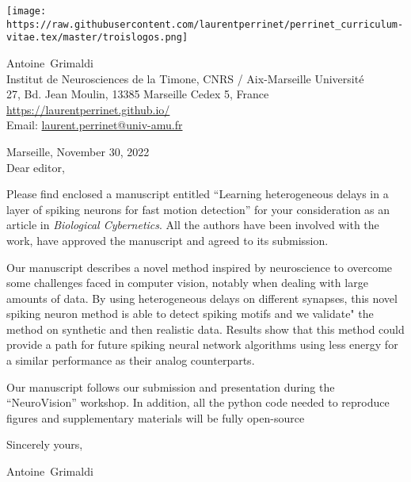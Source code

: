 \documentclass[10pt,english]{article}
\makeatletter
\newcommand{\LastName}{Grimaldi}%
\newcommand{\FirstName}{Antoine}%
\newcommand{\Institute}{Institut de Neurosciences de la Timone, CNRS / Aix-Marseille Universit\'e}%
\newcommand{\Address}{27, Bd. Jean Moulin, 13385 Marseille Cedex 5, France}%
\newcommand{\Website}{\url{https://laurentperrinet.github.io/}}%
\newcommand{\Email}{\url{laurent.perrinet@univ-amu.fr}}%
\makeatother
\begin{document}
\texttt{[image: https://raw.githubusercontent.com/laurentperrinet/perrinet\_curriculum-vitae.tex/master/troislogos.png]}
\\
\vspace{.1\baselineskip}
\hrulefill
\vspace{.1\baselineskip}

\begin{flushright}
	\FirstName\  \LastName\  \\
	\Institute\\[6pt]
	\Address\\%
	\Website \\
	  Email: \Email \\[6pt]
\end{flushright}
\justifying
\vspace{1\baselineskip}
Marseille, 
November 30, 2022%
\\[12pt] %
	
Dear editor,

Please find enclosed a manuscript entitled ``Learning heterogeneous delays in a layer of spiking neurons for fast motion detection'' for your consideration as an article in \emph{Biological Cybernetics}. All the authors have been involved with the work, have approved the manuscript and agreed to its submission.

Our manuscript describes a novel method inspired by neuroscience to overcome some challenges faced in computer vision, notably when dealing with large amounts of data. By using heterogeneous delays on different synapses, this novel spiking neuron method is able to detect spiking motifs and we validate" the method on synthetic and then realistic data. Results show that this method could provide a path for future spiking neural network algorithms using less energy for a similar performance as their analog counterparts.

Our  manuscript follows our submission and presentation during the ``NeuroVision'' workshop. In addition, all the python code needed to reproduce figures and supplementary materials will be fully open-source

Sincerely yours,%

\FirstName\ \LastName \\

\end{document}
